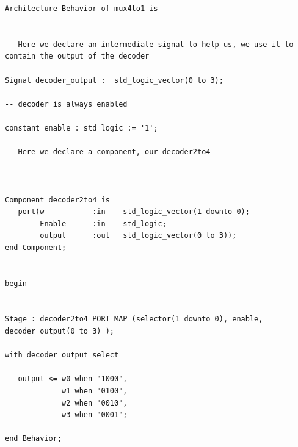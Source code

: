 \documentclass[a4paper]{article}
\begin{document}
\begin{itemize}
\begin{verbatim}
Architecture Behavior of mux4to1 is


-- Here we declare an intermediate signal to help us, we use it to contain the output of the decoder

Signal decoder_output :  std_logic_vector(0 to 3);

-- decoder is always enabled

constant enable : std_logic := '1';

-- Here we declare a component, our decoder2to4



Component decoder2to4 is 
   port(w           :in    std_logic_vector(1 downto 0);
        Enable      :in    std_logic;
        output      :out   std_logic_vector(0 to 3));
end Component;


begin 


Stage : decoder2to4 PORT MAP (selector(1 downto 0), enable, decoder_output(0 to 3) );

with decoder_output select 

   output <= w0 when "1000",
             w1 when "0100",
             w2 when "0010",
             w3 when "0001";

end Behavior;

\end{verbatim}
\end{itemize}
\end{document}
